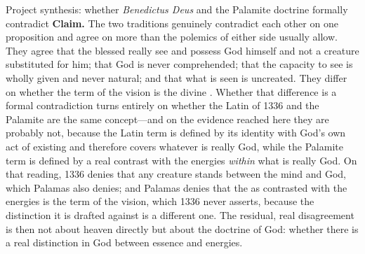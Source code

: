 \begin{studybox}{Project synthesis: whether \emph{Benedictus Deus} and the Palamite doctrine formally contradict}
\textbf{Claim.} The two traditions genuinely contradict each other on one proposition and agree on more than the polemics of either side usually allow. They agree that the blessed really see and possess God himself and not a creature substituted for him; that God is never comprehended; that the capacity to see is wholly given and never natural; and that what is seen is uncreated. They differ on whether the term of the vision is the divine . Whether that difference is a formal contradiction turns entirely on whether the Latin  of 1336 and the Palamite  are the same concept---and on the evidence reached here they are probably not, because the Latin term is defined by its identity with God's own act of existing and therefore covers whatever is really God, while the Palamite term is defined by a real contrast with the energies \emph{within} what is really God. On that reading, 1336 denies that any creature stands between the mind and God, which Palamas also denies; and Palamas denies that the  as contrasted with the energies is the term of the vision, which 1336 never asserts, because the distinction it is drafted against is a different one. The residual, real disagreement is then not about heaven directly but about the doctrine of God: whether there is a real distinction in God between essence and energies.


\end{studybox}
